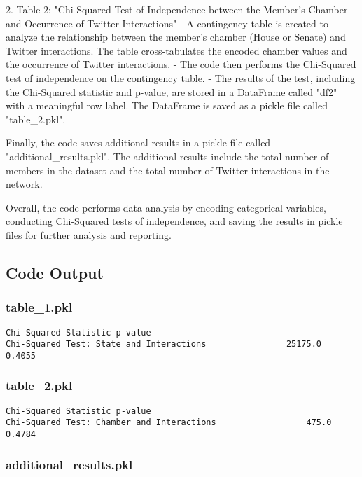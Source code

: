 \documentclass[11pt]{article}
\begin{document}
2. Table 2: "Chi-Squared Test of Independence between the Member's Chamber and Occurrence of Twitter Interactions"
   - A contingency table is created to analyze the relationship between the member's chamber (House or Senate) and Twitter interactions. The table cross-tabulates the encoded chamber values and the occurrence of Twitter interactions.
   - The code then performs the Chi-Squared test of independence on the contingency table.
   - The results of the test, including the Chi-Squared statistic and p-value, are stored in a DataFrame called "df2" with a meaningful row label. The DataFrame is saved as a pickle file called "table\_2.pkl".

Finally, the code saves additional results in a pickle file called "additional\_results.pkl". The additional results include the total number of members in the dataset and the total number of Twitter interactions in the network.

Overall, the code performs data analysis by encoding categorical variables, conducting Chi-Squared tests of independence, and saving the results in pickle files for further analysis and reporting.

\subsection{Code Output}

\subsubsection*{table\_1.pkl}

\begin{Verbatim}[tabsize=4]
                                          Chi-Squared Statistic p-value
Chi-Squared Test: State and Interactions                25175.0  0.4055
\end{Verbatim}

\subsubsection*{table\_2.pkl}

\begin{Verbatim}[tabsize=4]
                                            Chi-Squared Statistic p-value
Chi-Squared Test: Chamber and Interactions                  475.0  0.4784
\end{Verbatim}

\subsubsection*{additional\_results.pkl}
\end{document}
